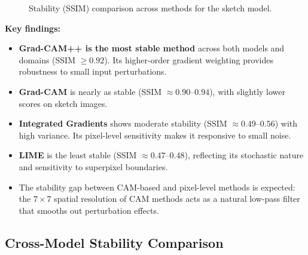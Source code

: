 \documentclass[12pt, a4paper]{article}
\begin{document}
\begin{figure}[H]
\centering
{}
\caption{Stability (SSIM) comparison across methods for the sketch model.}
\label{fig:stability_sketch}
\end{figure}

\textbf{Key findings:}
\begin{itemize}[leftmargin=*]
    \item \textbf{Grad-CAM++ is the most stable method} across both models and
          domains (SSIM $\geq 0.92$).  Its higher-order gradient weighting
          provides robustness to small input perturbations.
    \item \textbf{Grad-CAM} is nearly as stable (SSIM $\approx 0.90$--$0.94$),
          with slightly lower scores on sketch images.
    \item \textbf{Integrated Gradients} shows moderate stability (SSIM
          $\approx 0.49$--$0.56$) with high variance.  Its pixel-level
          sensitivity makes it responsive to small noise.
    \item \textbf{LIME} is the least stable (SSIM $\approx 0.47$--$0.48$),
          reflecting its stochastic nature and sensitivity to superpixel
          boundaries.
    \item The stability gap between CAM-based and pixel-level methods is
          expected: the $7 \times 7$ spatial resolution of CAM methods acts as
          a natural low-pass filter that smooths out perturbation effects.
\end{itemize}

\subsection{Cross-Model Stability Comparison}
\end{document}
